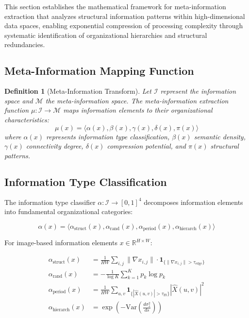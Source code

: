 \documentclass[11pt,a4paper]{article}
\newtheorem{definition}[theorem]{Definition}
\begin{document}
This section establishes the mathematical framework for meta-information extraction that analyzes structural information patterns within high-dimensional data spaces, enabling exponential compression of processing complexity through systematic identification of organizational hierarchies and structural redundancies.

\subsection{Meta-Information Mapping Function}

\begin{definition}[Meta-Information Transform]
Let $\mathcal{I}$ represent the information space and $\mathcal{M}$ the meta-information space. The meta-information extraction function $\mu: \mathcal{I} \to \mathcal{M}$ maps information elements to their organizational characteristics:
\begin{equation}
\mu(x) = \langle \alpha(x), \beta(x), \gamma(x), \delta(x), \pi(x) \rangle
\label{eq:meta-information-function}
\end{equation}
where $\alpha(x)$ represents information type classification, $\beta(x)$ semantic density, $\gamma(x)$ connectivity degree, $\delta(x)$ compression potential, and $\pi(x)$ structural patterns.
\end{definition}

\subsection{Information Type Classification}

The information type classifier $\alpha: \mathcal{I} \to [0,1]^4$ decomposes information elements into fundamental organizational categories:

\begin{equation}
\alpha(x) = \langle \alpha_{\text{struct}}(x), \alpha_{\text{rand}}(x), \alpha_{\text{period}}(x), \alpha_{\text{hierarch}}(x) \rangle
\label{eq:info-type-classification}
\end{equation}

For image-based information elements $x \in \mathbb{R}^{H \times W}$:

\begin{align}
\alpha_{\text{struct}}(x) &= \frac{1}{HW} \sum_{i,j} \|\nabla x_{i,j}\| \cdot \mathbf{1}_{\{\|\nabla x_{i,j}\| > \tau_{\text{edge}}\}} \label{eq:structural-score}\\
\alpha_{\text{rand}}(x) &= -\frac{1}{\log K} \sum_{k=1}^K p_k \log p_k \label{eq:randomness-score}\\
\alpha_{\text{period}}(x) &= \frac{1}{HW} \sum_{u,v} \mathbf{1}_{\{|\hat{X}(u,v)| > \tau_{\text{fft}}\}} |\hat{X}(u,v)|^2 \label{eq:periodicity-score}\\
\alpha_{\text{hierarch}}(x) &= \exp\left(-\text{Var}\left(\frac{d\sigma_s^2}{ds}\right)\right) \label{eq:hierarchical-score}
\end{align}
\end{document}
